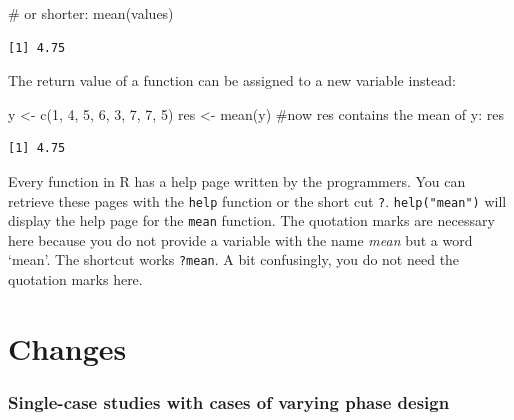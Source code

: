 \documentclass[
  letterpaper,
  DIV=11,
  numbers=noendperiod]{scrreprt}
\newenvironment{Shaded}{\begin{snugshade}}{\end{snugshade}}
\newcommand{\CommentTok}[1]{\textcolor[rgb]{0.37,0.37,0.37}{#1}}
\newcommand{\DecValTok}[1]{\textcolor[rgb]{0.68,0.00,0.00}{#1}}
\newcommand{\FunctionTok}[1]{\textcolor[rgb]{0.28,0.35,0.67}{#1}}
\newcommand{\NormalTok}[1]{\textcolor[rgb]{0.00,0.23,0.31}{#1}}
\newcommand{\OtherTok}[1]{\textcolor[rgb]{0.00,0.23,0.31}{#1}}
\begin{document}
\begin{Shaded}
\begin{Highlighting}[]
\CommentTok{\# or shorter:}
\FunctionTok{mean}\NormalTok{(values)}
\end{Highlighting}
\end{Shaded}

\begin{verbatim}
[1] 4.75
\end{verbatim}

The return value of a function can be assigned to a new variable
instead:

\begin{Shaded}
\begin{Highlighting}[]
\NormalTok{y }\OtherTok{\textless{}{-}} \FunctionTok{c}\NormalTok{(}\DecValTok{1}\NormalTok{, }\DecValTok{4}\NormalTok{, }\DecValTok{5}\NormalTok{, }\DecValTok{6}\NormalTok{, }\DecValTok{3}\NormalTok{, }\DecValTok{7}\NormalTok{, }\DecValTok{7}\NormalTok{, }\DecValTok{5}\NormalTok{)}
\NormalTok{res }\OtherTok{\textless{}{-}} \FunctionTok{mean}\NormalTok{(y)}
\CommentTok{\#now res contains the mean of y:}
\NormalTok{res}
\end{Highlighting}
\end{Shaded}

\begin{verbatim}
[1] 4.75
\end{verbatim}

Every function in R has a help page written by the programmers. You can
retrieve these pages with the \texttt{help} function or the short cut
\texttt{?}. \texttt{help("mean")} will display the help page for the
\texttt{mean} function. The quotation marks are necessary here because
you do not provide a variable with the name \emph{mean} but a word
`mean'. The shortcut works \texttt{?mean}. A bit confusingly, you do not
need the quotation marks here.

\hypertarget{changes}{%
\chapter{Changes}\label{changes}}

\hypertarget{single-case-studies-with-cases-of-varying-phase-design}{%
\subsection{Single-case studies with cases of varying phase
design}\label{single-case-studies-with-cases-of-varying-phase-design}}
\end{document}

